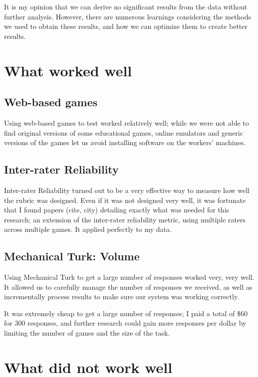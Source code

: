 \documentclass[12pt]{report}
\begin{document}
	It is my opinion that we can derive no significant results from the data without further analysis. However, there are numerous learnings considering the methods we used to obtain these results, and how we can optimize them to create better results.

	\section{What worked well}
		
		\subsection{Web-based games}

			Using web-based games to test worked relatively well; while we were not able to find original versions of some educational games, online emulators and generic versions of the games let us avoid installing software on the workers' machines.

		\subsection{Inter-rater Reliability}

			Inter-rater Reliability turned out to be a very effective way to measure how well the rubric was designed. Even if it was not designed very well, it was fortunate that I found papers (cite, city) detailing exactly what was needed for this research; an extension of the inter-rater reliability metric, using multiple raters across multiple games. It applied perfectly to my data.

		\subsection{Mechanical Turk: Volume}

			Using Mechanical Turk to get a large number of responses worked very, very well. It allowed us to carefully manage the number of responses we received, as well as incrementally process results to make sure our system was working correctly. 

			It was extremely cheap to get a large number of responses; I paid a total of \$60 for 300 responses, and further research could gain more responses per dollar by limiting the number of games and the size of the task.


	\section{What did not work well}
\end{document}
